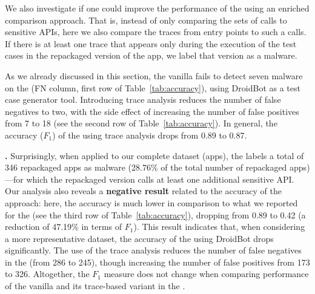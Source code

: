 We also investigate if one could improve the performance of
the \mas using an enriched comparison approach.
That is, instead of only comparing the sets of calls to sensitive APIs,
here we also compare the traces from entry points to such a calls. If there is
at least one trace that appears only during the execution of the
test cases in the repackaged version of the app, we
label that version as a malware.

As we already discussed in this section, the vanilla \mas fails
to detect seven malware on the \sds (FN column, first row of Table~\ref{tab:accuracy}),
using DroidBot as a test case generator tool. Introducing trace analysis reduces the
number of false negatives to two, with the side effect of increasing the
number of false positives from 7 to 18 (see the second row of Table~\ref{tab:accuracy}).
In general, the accuracy ($F_1$) of the \mas using trace analysis drops from 0.89 to 0.87.





{\bf \cds.} Surprisingly, when applied to our complete dataset (\apps apps), the \mas
labels a total of 346 repackaged apps as malware (28.76\% of the total number of repackaged
apps)---for which the repackaged version calls at least one additional sensitive API.
Our analysis also reveals a {\bf negative result} related to the accuracy of the approach: here,
the accuracy is much lower in comparison to what we reported for the
\sds (see the third row of Table~\ref{tab:accuracy}), dropping from 0.89 to 0.42 (a reduction of 47.19\% in terms of $F_1$).
This result indicates that, when considering a more representative dataset, the accuracy of the \mas using
DroidBot drops significantly. The use of the trace analysis reduces the number of
false negatives in the \cds (from 286 to 245), though increasing the number of false positives
from 173 to 326. Altogether, the $F_1$ measure does not change when comparing performance of the vanilla \mas and
its trace-based variant in the \cds. 




